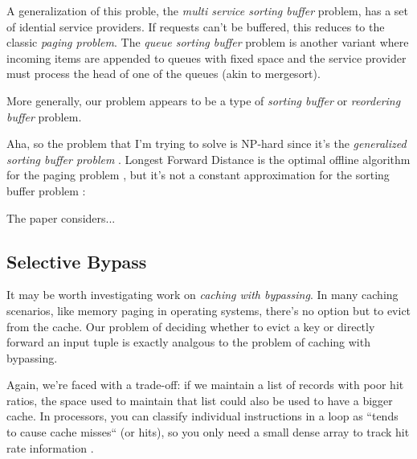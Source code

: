 \documentclass[12pt]{article}
\begin{document}
A generalization of this proble, the \emph{multi service sorting buffer} problem, has a set of idential service providers.  If requests can't be buffered, this reduces to the classic \emph{paging problem}.  The \emph{queue sorting buffer} problem is another variant where incoming items are appended to queues with fixed space and the service provider must process the head of one of the queues (akin to mergesort).

More generally, our problem appears to be a type of \emph{sorting buffer} or \emph{reordering buffer} problem.

Aha, so the problem that I'm trying to solve is NP-hard since it's the \emph{generalized sorting buffer problem} \cite{sorting-buffer-np-hardness}.
Longest Forward Distance is the optimal offline algorithm for the paging problem \cite{lfd}, but it's not a constant approximation for the sorting buffer problem \cite{sorting-buffer-np-hardness}:

The paper \cite{competitive-reordering-algorithm} considers...



\subsection{Selective Bypass}
It may be worth investigating work on \emph{caching with bypassing}.  In many caching scenarios, like memory paging in operating systems, there's no option but to evict from the cache.  Our problem of deciding whether to evict a key or directly forward an input tuple is exactly analgous to the problem of caching with bypassing.

Again, we're faced with a trade-off: if we maintain a list of records with poor hit ratios, the space used to maintain that list could also be used to have a bigger cache.  In processors, you can classify individual instructions in a loop as ``tends to cause cache misses`` (or hits), so you only need a small dense array to track hit rate information \cite{automatic-cache-bypass}.



\end{document}
